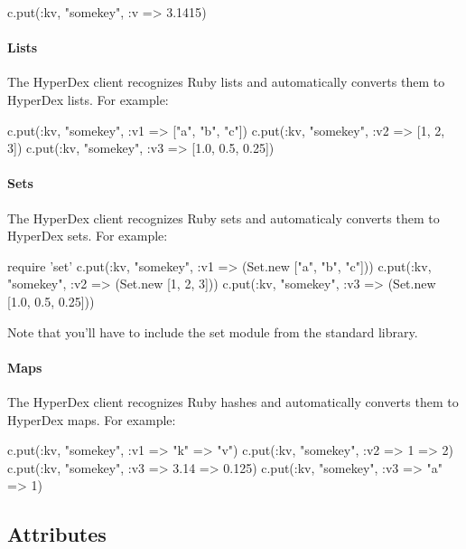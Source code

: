 \begin{rubycode}
c.put(:kv, "somekey", {:v => 3.1415})
\end{rubycode}

\paragraph{Lists}

The HyperDex client recognizes Ruby lists and automatically converts them to
HyperDex lists.  For example:

\begin{rubycode}
c.put(:kv, "somekey", {:v1 => ["a", "b", "c"]})
c.put(:kv, "somekey", {:v2 => [1, 2, 3]})
c.put(:kv, "somekey", {:v3 => [1.0, 0.5, 0.25]})
\end{rubycode}

\paragraph{Sets}

The HyperDex client recognizes Ruby sets and automaticaly converts them to
HyperDex sets.  For example:

\begin{rubycode}
require 'set'
c.put(:kv, "somekey", {:v1 => (Set.new ["a", "b", "c"])})
c.put(:kv, "somekey", {:v2 => (Set.new [1, 2, 3])})
c.put(:kv, "somekey", {:v3 => (Set.new [1.0, 0.5, 0.25])})
\end{rubycode}

Note that you'll have to include the set module from the standard library.

\paragraph{Maps}

The HyperDex client recognizes Ruby hashes and automatically converts them to
HyperDex maps.  For example:

\begin{rubycode}
c.put(:kv, "somekey", {:v1 => {"k" => "v"}})
c.put(:kv, "somekey", {:v2 => {1 => 2}})
c.put(:kv, "somekey", {:v3 => {3.14 => 0.125}})
c.put(:kv, "somekey", {:v3 => {"a" => 1}})
\end{rubycode}

\subsection{Attributes}
\label{sec:api:ruby:attributes}

